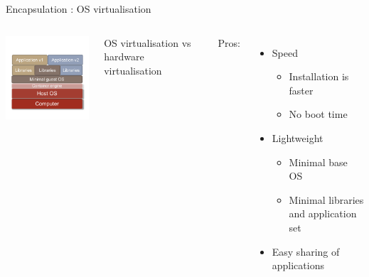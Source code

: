 \begin{frame}{Encapsulation : OS virtualisation}
\begin{columns}

\includegraphics[width=6cm]{02_encapsulation/figures/intro_docker_60.pdf}

OS virtualisation vs hardware virtualisation

Pros:
\begin{itemize}
  \item Speed 
  \begin{itemize}
    \item Installation is faster
    \item No boot time
  \end{itemize}
  \item Lightweight
  \begin{itemize}
    \item Minimal base OS
    \item Minimal libraries and application set
  \end{itemize}
  \item Easy sharing of applications
\end{itemize}

\end{columns}
\end{frame}

